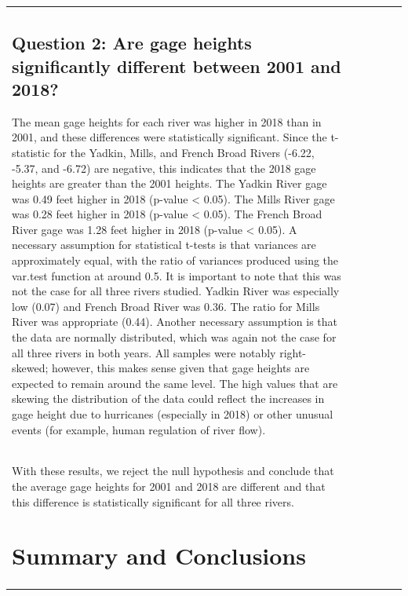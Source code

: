 \documentclass[
  12pt,
]{article}
\begin{document}
\begin{table}
\begin{tabular}[t]{|>{}l|||>{}r|||>{}r|||>{}r|||>{}r||r}
\hypertarget{question-2-are-gage-heights-significantly-different-between-2001-and-2018}{%
\subsection{Question 2: Are gage heights significantly different between
2001 and
2018?}\label{question-2-are-gage-heights-significantly-different-between-2001-and-2018}}

The mean gage heights for each river was higher in 2018 than in 2001,
and these differences were statistically significant. Since the
t-statistic for the Yadkin, Mills, and French Broad Rivers (-6.22,
-5.37, and -6.72) are negative, this indicates that the 2018 gage
heights are greater than the 2001 heights. The Yadkin River gage was
0.49 feet higher in 2018 (p-value \textless{} 0.05). The Mills River
gage was 0.28 feet higher in 2018 (p-value \textless{} 0.05). The French
Broad River gage was 1.28 feet higher in 2018 (p-value \textless{}
0.05). A necessary assumption for statistical t-tests is that variances
are approximately equal, with the ratio of variances produced using the
var.test function at around 0.5. It is important to note that this was
not the case for all three rivers studied. Yadkin River was especially
low (0.07) and French Broad River was 0.36. The ratio for Mills River
was appropriate (0.44). Another necessary assumption is that the data
are normally distributed, which was again not the case for all three
rivers in both years. All samples were notably right-skewed; however,
this makes sense given that gage heights are expected to remain around
the same level. The high values that are skewing the distribution of the
data could reflect the increases in gage height due to hurricanes
(especially in 2018) or other unusual events (for example, human
regulation of river flow).\\
With these results, we reject the null hypothesis and conclude that the
average gage heights for 2001 and 2018 are different and that this
difference is statistically significant for all three rivers.

\newpage

\hypertarget{summary-and-conclusions}{%
\section{Summary and Conclusions}\label{summary-and-conclusions}}


\end{tabular}
\end{table}
\end{document}
